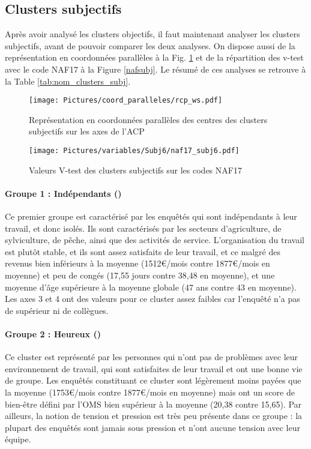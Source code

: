 \documentclass[11pt,fleqn,a4paper,openany,frenchb]{book} %
\begin{document}
\subsection{Clusters subjectifs }

Après avoir analysé les clusters objectifs, il faut maintenant analyser les clusters subjectifs, avant de pouvoir comparer les deux analyses. On dispose aussi de la représentation en coordonnées parallèles à la Fig. \ref{fig:CPsubj} et de la répartition des v-test avec le code NAF17 à la Figure \ref{nafsubj}. Le résumé de ces analyses se retrouve à la Table \ref{tab:nom_clusters_subj}.

\begin{figure}[!h]
\centering
  \texttt{[image: Pictures/coord\_paralleles/rcp\_ws.pdf]}
\caption{Représentation en coordonnées parallèles des centres des clusters subjectifs sur les axes de l'ACP}
\label{fig:CPsubj}
\end{figure}

\begin{figure}[!h]
\centering
  \texttt{[image: Pictures/variables/Subj6/naf17\_subj6.pdf]}
\caption{Valeurs V-test des clusters subjectifs sur les codes NAF17}
\label{fig:nafsubj}
\end{figure}

\paragraph{Groupe 1 : Indépendants (\INDEP)\\}
Ce premier groupe est caractérisé par les enquêtés qui sont indépendants à leur travail, et donc isolés. Ils sont caractérisés par les secteurs d'agriculture,  de sylviculture, de pêche, ainsi que des activités de service. L'organisation du travail est plutôt stable, et ils sont assez satisfaits de leur travail, et ce malgré des revenus bien inférieurs à la moyenne (1512\euro{}/mois contre 1877\euro{}/mois en moyenne) et peu de congés (17,55 jours contre 38,48 en moyenne), et une moyenne d'âge supérieure à la moyenne globale (47 ans contre 43 en moyenne). Les axes 3 et 4 ont des valeurs pour ce cluster assez faibles car l'enquêté n'a pas de supérieur ni de collègues.

\paragraph{Groupe 2 : Heureux (\HEUR)\\}
Ce cluster est représenté par les personnes qui n'ont pas de problèmes avec leur environnement de travail, qui sont satisfaites de leur travail et ont une bonne vie de groupe. Les enquêtés constituant ce cluster sont légèrement moins payées que la moyenne (1753\euro{}/mois contre 1877\euro{}/mois en moyenne) mais ont un score de bien-être défini par l'OMS bien supérieur à la moyenne (20,38 contre 15,65). Par ailleurs, la notion de tension et pression est très peu présente dans ce groupe : la plupart des enquêtés sont jamais sous pression et n'ont aucune tension avec leur équipe.
\end{document}
